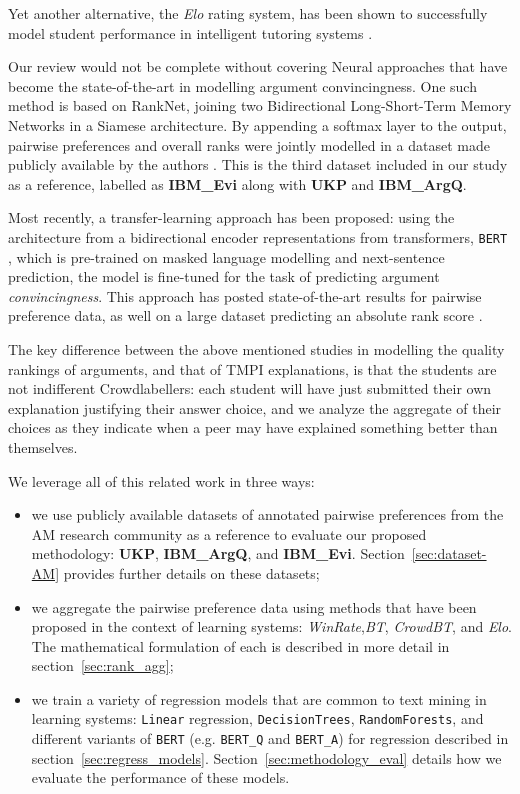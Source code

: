 \documentclass[notitlepage,12pt]{jedm}
\begin{document}
Yet another alternative, the \textit{Elo} rating system, has been shown to successfully
model student performance in intelligent tutoring systems \cite{pelanek_applications_2016}.

Our review would not be complete without covering Neural approaches that have become the state-of-the-art in modelling argument 
convincingness.
One such method is based on RankNet, joining two Bidirectional Long-Short-Term 
Memory Networks in a Siamese architecture. 
By appending a softmax layer to the output, pairwise preferences and overall 
ranks were jointly modelled in a dataset made publicly available by the authors 
\cite{gleize_are_2019}.
This is the third dataset included in our study as a reference, labelled as 
\textbf{IBM\_Evi} along with \textbf{UKP} and \textbf{IBM\_ArgQ}.

Most recently, a transfer-learning approach has been proposed: using the 
architecture from a bidirectional encoder representations from transformers, 
\verb|BERT| \cite{devlin_bert_2018}, which is pre-trained on masked language 
modelling and next-sentence prediction, the model is fine-tuned for the task of 
predicting argument \textit{convincingness}.
This approach has posted state-of-the-art results for pairwise preference data, 
as well on a large dataset predicting an absolute rank score 
\cite{gretz_large-scale_2019}.

The key difference between the above mentioned studies in modelling the quality 
rankings of arguments, and that of TMPI explanations, is that the students are 
not indifferent Crowdlabellers: each student will have just submitted their 
own explanation justifying their answer choice, and we analyze the aggregate of 
their choices as they indicate when a peer may have explained something better 
than themselves.

We leverage all of this related work in three ways:
\begin{itemize}
	\item we use publicly available datasets of annotated pairwise preferences 
	from the AM research community as a reference to evaluate our proposed 
	methodology: \textbf{UKP}, \textbf{IBM\_ArgQ}, and \textbf{IBM\_Evi}. 
	Section~\ref{sec:dataset-AM} provides further details on these datasets;
	\item we aggregate the pairwise preference data using methods that have 
	been proposed in the context of learning systems: 
	\textit{WinRate},\textit{BT}, \textit{CrowdBT}, and \textit{Elo}.
	The mathematical formulation of each is described in more detail in section~\ref{sec:rank_agg};
	\item we train a variety of regression models that are common to text 
	mining in learning systems: \verb|Linear| regression, \verb|DecisionTrees|, 
	\verb|RandomForests|, and different variants of \verb|BERT| (e.g. 
	\verb|BERT_Q| and \verb|BERT_A|) for regression described in section~\ref{sec:regress_models}. 
	Section~\ref{sec:methodology_eval} details how we evaluate the performance of these models.
\end{itemize}
\end{document}
